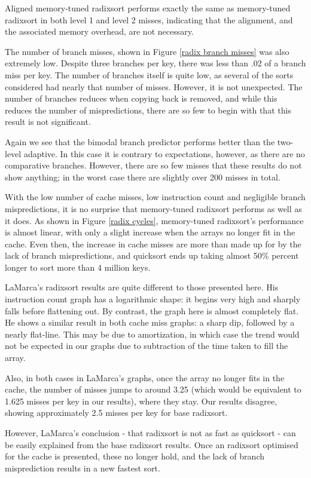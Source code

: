 Aligned memory-tuned radixsort performs exactly the same as memory-tuned radixsort in both
level 1 and level 2 misses, indicating that the alignment, and the associated
memory overhead, are not necessary.

The number of branch misses, shown in Figure \ref{radix branch misses} was also
extremely low. Despite three branches per key, there was less than .02 of a branch
miss per key. The number of branches itself is quite low, as several of the
sorts considered had nearly that number of misses. However, it is not
unexpected. The number of branches reduces when copying back is removed, and
while this reduces the number of mispredictions, there are so few to begin with
that this result is not significant.

Again we see that the bimodal branch predictor performs better than the
two-level adaptive. In this case it is contrary to expectations, however, as
there are no comparative branches. However, there are so few misses that these
results do not show anything; in the worst case there are slightly over 200
misses in total.

With the low number of cache misses, low instruction count and negligible branch
mispredictions, it is no surprise that memory-tuned radixsort performs as well as it
does. As shown in Figure \ref{radix cycles}, memory-tuned radixsort's performance is
almost linear, with only a slight increase when the arrays no longer fit in the
cache.  Even then, the increase in cache misses are more than made up for by the
lack of branch mispredictions, and quicksort ends up taking almost 50\% percent
longer to sort more than 4 million keys.

LaMarca's radixsort results are quite different to those presented here. His
instruction count graph has a logarithmic shape: it begins very high and sharply
falls before flattening out. By contrast, the graph here is almost completely
flat. He shows a similar result in both cache miss graphs: a sharp dip, followed
by a nearly flat-line. This may be due to amortization, in which case the trend
would not be expected in our graphs due to subtraction of the time taken to fill
the array.

Also, in both cases in LaMarca's graphs, once the array no longer fits in the
cache, the number of misses jumps to around 3.25 (which would be equivalent to
1.625 misses per key in our results), where they stay. Our results
disagree, showing approximately 2.5 misses per key for base radixsort.

However, LaMarca's conclusion - that radixsort is not as fast as quicksort - can
be easily explained from the base radixsort results. Once an radixsort optimised
for the cache is presented, these no longer hold, and the lack of branch
misprediction results in a new fastest sort.

